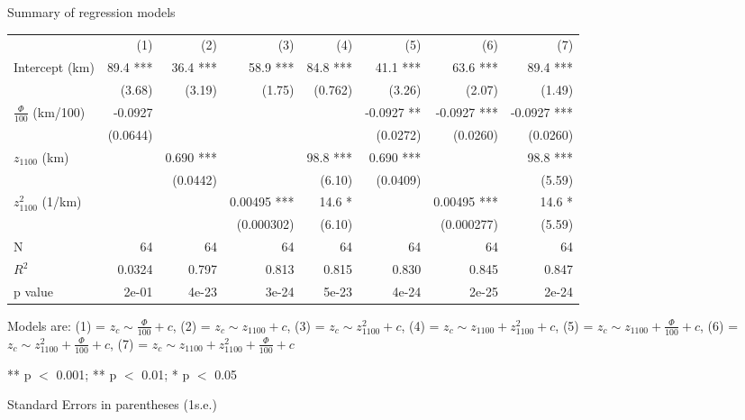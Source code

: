 \documentclass[draft]{assets/agujournal2019}
\begin{document}
\begin{threeparttable}[H]
 \caption{Summary of regression models}
 \label{TableS2}
 \begin{tabularx}{\textwidth}{L{1} R{1} R{1} R{1} R{1} R{1} R{1} R{1}}

  \toprule

                              & (1)      & (2)       & (3)         & (4)      & (5)        & (6)         & (7)         \\

  \cmidrule(r){2-8}

  Intercept (km)              & 89.4 *** & 36.4 ***  & 58.9 ***    & 84.8 *** & 41.1 ***   & 63.6 ***    & 89.4 ***    \\
                              & (3.68)   & (3.19)    & (1.75)      & (0.762)  & (3.26)     & (2.07)      & (1.49)      \\
  $\frac{\Phi}{100}$ (km/100) & -0.0927  &           &             &          & -0.0927 ** & -0.0927 *** & -0.0927 *** \\
                              & (0.0644) &           &             &          & (0.0272)   & (0.0260)    & (0.0260)    \\
  $z_{1100}$ (km)             &          & 0.690 *** &             & 98.8 *** & 0.690 ***  &             & 98.8 ***    \\
                              &          & (0.0442)  &             & (6.10)   & (0.0409)   &             & (5.59)      \\
  $z_{1100}^{2}$ (1/km)       &          &           & 0.00495 *** & 14.6 *   &            & 0.00495 *** & 14.6 *      \\
                              &          &           & (0.000302)  & (6.10)   &            & (0.000277)  & (5.59)      \\

  \cmidrule(r){2-8}

  N                           & 64       & 64        & 64          & 64       & 64         & 64          & 64          \\
  $R^2$                       & 0.0324   & 0.797     & 0.813       & 0.815    & 0.830      & 0.845       & 0.847       \\
  p value                     & 2e-01    & 4e-23     & 3e-24       & 5e-23    & 4e-24      & 2e-25       & 2e-24       \\

  \bottomrule
 \end{tabularx}
 \begin{tablenotes}
  \footnotesize
  \item Models are:
  (1) = $z_{c}\sim\frac{\Phi}{100}+c$,
  (2) = $z_{c}\sim{}z_{1100}+c$,
  (3) = $z_{c}\sim{}z_{1100}^2+c$,
  (4) = $z_{c}\sim{}z_{1100}+z_{1100}^2+c$,
  (5) = $z_{c}\sim{}z_{1100}+\frac{\Phi}{100}+c$,
  (6) = $z_{c}\sim{}z_{1100}^2+\frac{\Phi}{100}+c$,
  (7) = $z_{c}\sim{}z_{1100}+z_{1100}^2+\frac{\Phi}{100}+c$
  \item *** p $<$ 0.001;  ** p $<$ 0.01;  * p $<$ 0.05
  \item Standard Errors in parentheses  (1s.e.)
 \end{tablenotes}
\end{threeparttable}
\end{document}
